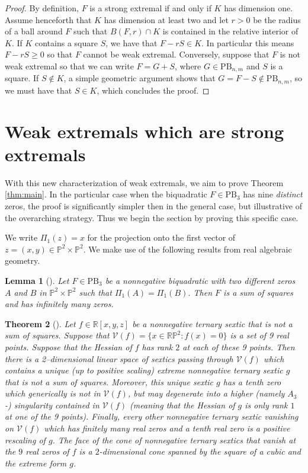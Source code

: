\documentclass[a4paper]{article}
\numberwithin{equation}{section}
\newcommand{\R}{\mathbb{R}}
\newcommand{\ProjP}{\mathbb{P}}
\renewcommand{\P}{\mathbb{P}}
\newtheorem{theorem}{Theorem}[section]
\newtheorem{lemma}[theorem]{Lemma}
\theoremstyle{definition}
\theoremstyle{remark}
\newcommand{\pbnm}{\mathrm{PB}_{n,m}}
\begin{document}
\begin{proof}
By definition, $F$ is a strong extremal if and only if $K$ has dimension one. Assume henceforth that $K$ has dimension at least two and let $r>0$ be the radius of a ball around $F$ such that $B(F,r)\cap K$ is contained in the relative interior of $K$. If $K$ contains a square $S$, we have that $F-rS\in K$. In particular this means $F-rS\geq 0$ so that $F$ cannot be weak extremal. Conversely, suppose that $F$ is not weak extremal so that we can write $F=G+S$, where $G\in\pbnm$ and $S$ is a square. If $S\notin K$, a simple geometric argument shows that $G=F-S\notin\pbnm$, so we must have that $S\in K$, which concludes the proof. 
\end{proof}

\section{Weak extremals which are strong extremals}\label{sec:weak-strong}

With this new characterization of weak extremals, we aim to prove Theorem \ref{thm:main}.  In the particular case when the biquadratic $F \in \mathrm{PB}_3$ has nine \emph{distinct} zeros, the proof is significantly simpler then in the general case, but illustrative of the overarching strategy.  Thus we begin the section by proving this specific case.

We write $\Pi_1(z) = x$ for the projection onto the first vector of $z = (x,y) \in \ProjP^2 \times \ProjP^2$. We make use of the following results from real algebraic geometry.

\begin{lemma}[\cite{Quarez2015}]\label{lem:quarez_same_component}
Let $F \in \mathrm{PB}_3$ be a nonnegative biquadratic with two different zeros $A$ and $B$ in $\ProjP^2 \times \ProjP^2$ such that $\Pi_1(A) = \Pi_1(B)$.  Then $F$ is a sum of squares and has infinitely many zeros.
\end{lemma}


\begin{theorem}[\cite{KS2018}]\label{theorem:ternary_sextic_nine_zeros}
Let $f\in \R[x,y,z]$ be a nonnegative ternary sextic that is not a sum of squares.
Suppose that $\mathcal V(f) = \{x\in \R\P^2 \colon f(x) = 0\}$ is a set of 9 real points. Suppose that the Hessian of $f$ has rank $2$ at each of these 9 points.
Then there is a 2--dimensional linear space of sextics passing through $\mathcal V(f)$ which contains a unique (up to positive scaling) extreme nonnegative ternary sextic $g$ that is not a sum of squares.
Moreover, this unique sextic $g$ has a tenth zero which generically is not in $\mathcal V(f)$, but may degenerate into a higher (namely $A_3$-) singularity contained in $\mathcal V(f)$ (meaning that the Hessian of $g$ is only rank $1$ at one of the 9 points). 
Finally, every other nonnegative ternary sextic vanishing on $\mathcal V(f)$ which has finitely many real zeros and a tenth real zero is a positive rescaling of $g$.
The face of the cone of nonnegative ternary sextics that vanish at the $9$ real zeros of $f$ is a $2$-dimensional cone spanned by the square of a cubic and the extreme form $g$.
\end{theorem}
\end{document}
